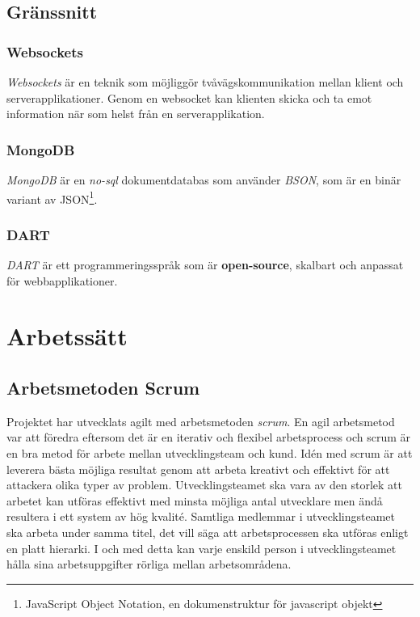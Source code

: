 \documentclass[a4paper,12pt,oneside,final]{extbook}
\begin{document}
\section{Gränssnitt}
\subsection{Websockets}
\emph{Websockets} är en teknik som möjliggör tvåvägskommunikation mellan klient och serverapplikationer. Genom en websocket kan klienten skicka och ta emot information när som helst från en serverapplikation. %

\subsection{MongoDB}
\emph{MongoDB} är en \emph{no-sql} dokumentdatabas som använder \emph{BSON}, som är en binär variant av JSON\footnote{JavaScript Object Notation, en dokumenstruktur för javascript objekt}.

\subsection{DART} 
\emph{DART} är ett programmeringsspråk som är \textbf{open-source}, skalbart och anpassat för webbapplikationer.


\chapter{Arbetssätt}
\section{Arbetsmetoden Scrum}
Projektet har utvecklats agilt med arbetsmetoden \emph{scrum}. En agil arbetsmetod var att föredra eftersom det är en iterativ och flexibel arbetsprocess och scrum är en bra metod för arbete mellan utvecklingsteam och kund. Idén med scrum är att leverera bästa möjliga resultat genom att arbeta kreativt och effektivt för att attackera olika typer av problem. Utvecklingsteamet ska vara av den storlek att arbetet kan utföras effektivt med minsta möjliga antal utvecklare men ändå resultera i ett system av hög kvalité. Samtliga medlemmar i utvecklingsteamet ska arbeta under samma titel, det vill säga att arbetsprocessen ska utföras enligt en platt hierarki. I och med detta kan varje enskild person i utvecklingsteamet hålla sina arbetsuppgifter rörliga mellan arbetsområdena.
\end{document}
